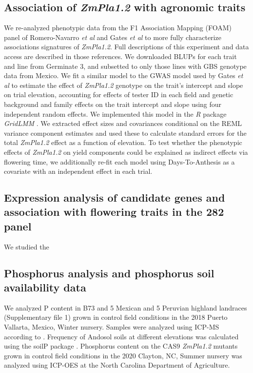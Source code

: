 \documentclass[9pt,twocolumn,twoside,lineno]{gsajnl}
\begin{document}
\subsection{Association of \textit{ZmPla1.2} with agronomic traits}
We re-analyzed phenotypic data from the F1 Association Mapping (FOAM) panel of Romero-Navarro \textit{et al} \cite{Romero_Navarro2017-cn} and Gates \textit{et al} \cite{Gates2019-xu} to more fully characterize associations signatures of \textit{ZmPla1.2}. 
Full descriptions of this experiment and data access are described in those references. 
We downloaded BLUPs for each trait and line from Germinate 3, and subsetted to only those lines with GBS genotype data from Mexico. 
We fit a similar model to the GWAS model used by Gates \textit{et al} \cite{Gates2019-xu} to estimate the effect of \textit{ZmPla1.2} genotype on the trait's intercept and slope on trial elevation, accounting for effects of tester ID in each field and genetic background and family effects on the trait intercept and slope using four independent random effects. 
We implemented this model in the \textit{R} package \textit{GridLMM} \cite{GridLMM2019}. 
We extracted effect sizes and covariances conditional on the REML variance component estimates and used these to calculate standard errors for the total \textit{ZmPla1.2} effect as a function of elevation. 
To test whether the phenotypic effects of \textit{ZmPla1.2} on yield components could be explained as indirect effects via flowering time, we additionally re-fit each model using Days-To-Anthesis as a covariate with an independent effect in each trial.
\subsection{Expression analysis of candidate genes and association with flowering traits in the 282 panel}
We studied the 

\subsection{Phosphorus analysis and phosphorus soil availability data}
We analyzed P content in B73 and 5 Mexican  and 5 Peruvian highland landraces (Supplementary file 1) grown in control field conditions in the 2018 Puerto Vallarta, Mexico, Winter nursery. Samples were analyzed using ICP-MS according to \cite{Baxter2014-ch}. 
Frequency of Andosol soils at different elevations was calculated using the soilP package \cite{Rodriguez-Zapata2018-vz}.
Phosphorus content on the CAS9 \textit{ZmPla1.2} mutants grown in control field conditions in the 2020 Clayton, NC, Summer nursery was analyzed using ICP-OES at the North Carolina Department of Agriculture.   
\end{document}
